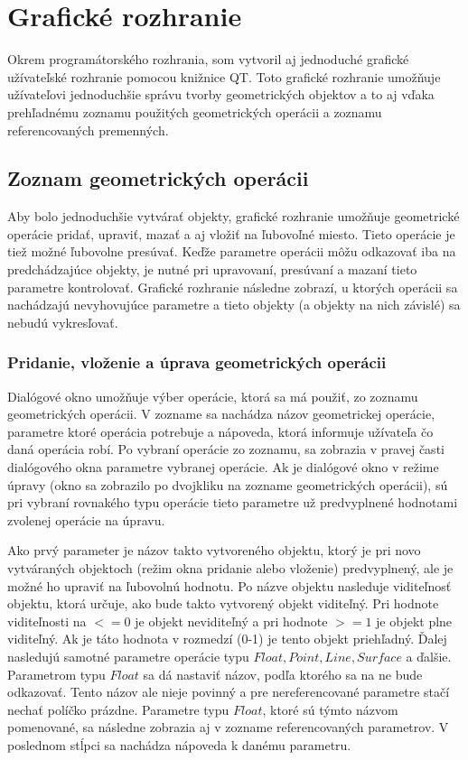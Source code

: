 \chapter{Grafické rozhranie}
Okrem programátorského rozhrania, som vytvoril aj jednoduché grafické užívateľské rozhranie pomocou knižnice QT. Toto grafické rozhranie umožňuje užívateľovi jednoduchšie správu tvorby geometrických objektov a to aj vďaka prehľadnému zoznamu použitých geometrických operácii a zoznamu referencovaných premenných. 

\section{Zoznam geometrických operácii}
Aby bolo jednoduchšie vytvárať objekty, grafické rozhranie umožňuje geometrické operácie pridať, upraviť, mazať a aj vložiť na ľubovoľné miesto. Tieto operácie je tiež možné ľubovolne presúvať. Keďže parametre operácii môžu odkazovať iba na predchádzajúce objekty, je nutné pri upravovaní, presúvaní a mazaní tieto parametre kontrolovať. Grafické rozhranie následne zobrazí, u ktorých operácii sa nachádzajú nevyhovujúce parametre a tieto objekty (a objekty na nich závislé) sa nebudú vykresľovať.



\subsection{Pridanie, vloženie a úprava geometrických operácii} 
Dialógové okno umožňuje výber operácie,  ktorá sa má použiť, zo zoznamu geometrických operácii. V zozname sa nachádza názov geometrickej operácie, parametre ktoré operácia potrebuje a nápoveda, ktorá informuje užívateľa čo daná operácia robí.
Po vybraní operácie zo zoznamu, sa zobrazia v pravej časti dialógového okna parametre vybranej operácie. Ak je dialógové okno v režime úpravy (okno sa zobrazilo po dvojkliku na zozname geometrických operácii), sú pri vybraní rovnakého typu operácie tieto parametre už predvyplnené hodnotami zvolenej operácie na úpravu.

Ako prvý parameter je názov takto vytvoreného objektu, ktorý je pri novo vytváraných objektoch (režim okna pridanie alebo vloženie) predvyplnený, ale je možné ho upraviť na ľubovolnú hodnotu.  
Po názve objektu nasleduje viditeľnosť objektu, ktorá určuje, ako bude takto vytvorený objekt viditeľný. Pri hodnote viditeľnosti na $<=0$ je objekt neviditeľný a pri hodnote $>=1$ je objekt plne viditeľný. Ak je táto hodnota v rozmedzí (0-1) je tento objekt priehľadný. 
Ďalej nasledujú samotné parametre operácie typu $Float,  Point, Line, Surface$ a ďalšie. Parametrom typu $Float$ sa dá nastaviť názov, podľa ktorého sa na ne bude odkazovať. Tento názov ale nieje povinný a pre nereferencované parametre stačí nechať políčko prázdne. Parametre typu $Float$, ktoré sú týmto názvom pomenované, sa následne zobrazia aj v zozname referencovaných parametrov.
V poslednom stĺpci sa nachádza nápoveda k danému parametru.

